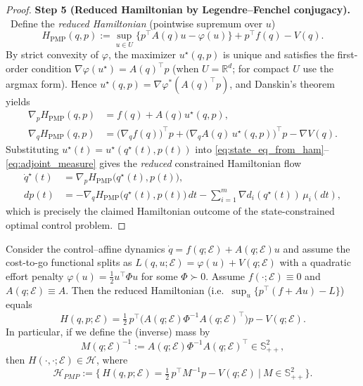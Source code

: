 \begin{proof}
\smallskip
\noindent\textbf{Step 5 (Reduced Hamiltonian by Legendre--Fenchel conjugacy).}
~Define the \emph{reduced Hamiltonian} (pointwise supremum over $u$)
\begin{equation}
H_{\mathrm{PMP}}(q,p)
:=\sup_{u\in U}\Big\{p^\top A(q)u-\varphi(u)\Big\}+p^\top f(q)-V(q).
\end{equation}
By strict convexity of $\varphi$, the maximizer $u^\star(q,p)$ is unique and satisfies the first-order condition
$\nabla\varphi(u^\star)=A(q)^\top p$ (when $U=\mathbb{R}^d$; for compact $U$ use the argmax form).
Hence $u^\star(q,p)=\nabla\varphi^\ast(A(q)^\top p)$, and Danskin's theorem yields
\[
\begin{aligned}
\nabla_p H_{\mathrm{PMP}}(q,p)&=f(q)+A(q)u^\star(q,p), \\
\nabla_q H_{\mathrm{PMP}}(q,p)&=\big(\nabla_q f(q)\big)^\top p+\big(\nabla_q A(q)\,u^\star(q,p)\big)^\top p-\nabla V(q).    
\end{aligned}
\]
Substituting $u^\star(t)=u^\star(q^\star(t),p(t))$ into
\cref{eq:state_eq_from_ham}--\cref{eq:adjoint_measure} gives the \emph{reduced} constrained Hamiltonian flow
\begin{equation}
\begin{aligned}
\dot q^\star(t)&=\nabla_p H_{\mathrm{PMP}}\big(q^\star(t),p(t)\big), \\ 
dp(t)&= -\nabla_q H_{\mathrm{PMP}}\big(q^\star(t),p(t)\big)\,dt -\sum_{i=1}^m \nabla d_i(q^\star(t))\,\mu_i(dt),    
\end{aligned}
\end{equation}
which is precisely the claimed Hamiltonian outcome of the state-constrained optimal control problem.
\end{proof}

\begin{corollary}
\label{cor:mechanical_reduced_hamiltonian}
Consider the control--affine dynamics $\dot q=f(q;\mathcal E)+A(q;\mathcal E)u$ and assume the { cost-to-go functional} splits as
$L(q,u;\mathcal E)=\varphi(u) + {V}(q;\mathcal E)$ with a quadratic effort penalty
\(
\varphi(u)=\tfrac12 u^\top \Phi u
\)
 for some $\Phi\succ 0$. Assume $f(\cdot;\mathcal E)\equiv 0$ and $A(q;\mathcal{E})\equiv A$.
Then the reduced Hamiltonian (i.e.\ $\sup_u\{p^\top(f+A u)-L\}$) equals
\[
H(q,p;\mathcal E)
=\tfrac12\,p^\top\!\big(A(q;\mathcal E)\Phi^{-1}A(q;\mathcal E)^\top\big)p -V(q;\mathcal E).
\]
In particular, if we define the (inverse) mass by
\[
M(q;\mathcal E)^{-1}:=A(q;\mathcal E)\Phi^{-1}A(q;\mathcal E)^\top\in\mathbb S_{++}^2,
\]
then \(H(\cdot,\cdot;\mathcal E)\in\mathscr H\), where
\[
\mathscr{H}_{PMP}:=\Big\{\,H(q,p;\mathcal{E})=\tfrac12\,p^\top M^{-1}p{-}V(q;\mathcal{E})
\ \Big|\ M\in \mathbb{S}_{++}^2 \Big\}.
\]
\end{corollary}


